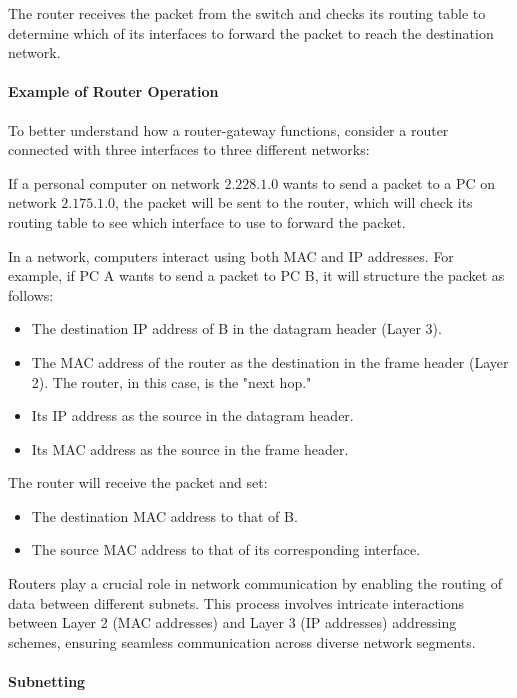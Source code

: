 The router receives the packet from the switch and checks its routing table to determine which of its interfaces to forward the packet to reach the destination network.

\paragraph{Example of Router Operation}
To better understand how a router-gateway functions, consider a router connected with three interfaces to three different networks:

If a personal computer on network $2.228.1.0$ wants to send a packet to a PC on network $2.175.1.0$, the packet will be sent to the router, which will check its routing table to see which interface to use to forward the packet.

In a network, computers interact using both MAC and IP addresses. For example, if PC A wants to send a packet to PC B, it will structure the packet as follows:

\begin{itemize}
    \item The destination IP address of B in the datagram header (Layer 3).
    \item The MAC address of the router as the destination in the frame header (Layer 2). The router, in this case, is the "next hop."
    \item Its IP address as the source in the datagram header.
    \item Its MAC address as the source in the frame header.
\end{itemize}

The router will receive the packet and set:
\begin{itemize}
    \item The destination MAC address to that of B.
    \item The source MAC address to that of its corresponding interface.
\end{itemize}

Routers play a crucial role in network communication by enabling the routing of data between different subnets. This process involves intricate interactions between Layer 2 (MAC addresses) and Layer 3 (IP addresses) addressing schemes, ensuring seamless communication across diverse network segments.


\paragraph{Subnetting}

